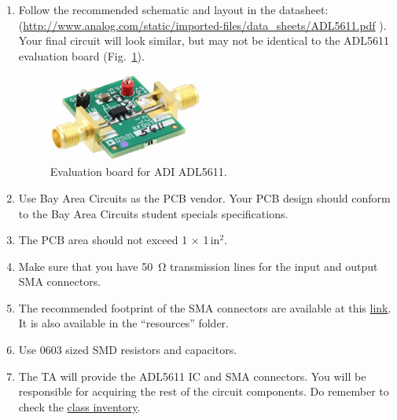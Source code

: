 \documentclass[letterpaper, 11pt]{article}
\begin{document}
\begin{enumerate}
	\item Follow the recommended schematic and layout in the datasheet:\\ (\url{http://www.analog.com/static/imported-files/data_sheets/ADL5611.pdf} ). Your final circuit will look similar, but may not be identical to the ADL5611 evaluation board (Fig.~\ref{fig:adl5611-evalz}).
 
		\begin{figure}[h]
			\centering
			\includegraphics[width=2in]{adl5611-evalz}
			\caption{Evaluation board for ADI ADL5611.}
			\label{fig:adl5611-evalz}
		\end{figure}
	\item Use Bay Area Circuits as the PCB vendor. Your PCB design should conform to the Bay Area Circuits student specials specifications. 
	
	\item The PCB area should not exceed 1 $\times$ 1\,in$^2$.
	 
	\item Make sure that you have \SI{50}{\ohm} transmission lines for the input and output SMA connectors.
	
	\item The recommended footprint of the SMA connectors are available at this \href{https://github.com/ucdart/UCD-EEC134/blob/master/labs/lab2/resources/SMA%20Size.jpg}{link}. It is also available in the ``resources'' folder. 
	
	\item Use 0603 sized SMD resistors and capacitors. 
	
	\item The TA will provide the ADL5611 IC and SMA connectors. You will be responsible for acquiring the rest of the circuit components. Do remember to check the \href{https://docs.google.com/spreadsheets/d/1GJnBLUymuVzXjrK0Zkdbc2lwTbw0z9a0JR4bLLzO-Sw/edit#gid=4}{class inventory}. 
	

\end{enumerate}
\end{document}
